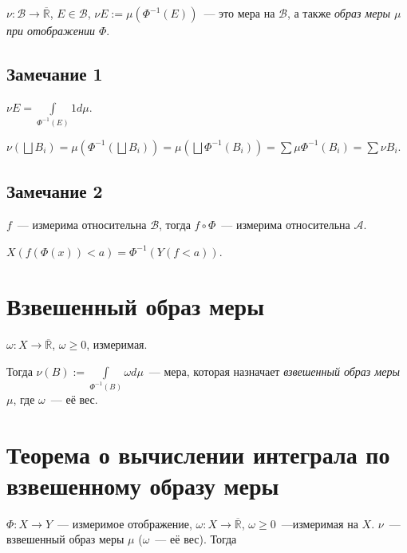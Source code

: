 \documentclass{article}
\begin{document}
        $\nu : \mathcal{B} \rightarrow \overline{\mathbb{R}}$, $E \in \mathcal{B}$, $\nu E := \mu(\Phi^{-1}(E))$~--- это мера на $\mathcal{B}$, а также \textit{образ меры $\mu$ при отображении $\Phi$}.

        \subsection{Замечание 1}
        
            $\nu E = \int\limits_{\Phi^{-1}(E)} 1 d \mu$.
            
            $\nu \left( \bigsqcup B_i \right) = \mu \left( \Phi^{-1} \left( \bigsqcup B_i \right) \right) = \mu \left( \bigsqcup \Phi^{-1}(B_i) \right) = \sum \mu \Phi^{-1}(B_i) = \sum \nu B_i$.
    
        \subsection{Замечание 2}
        
            $f$~--- измерима относительна $\mathcal{B}$, тогда $f \circ \Phi$~--- измерима относительна $\mathcal{A}$. 
            
            $X \left( f \left( \Phi(x) \right) < a \right) = \Phi^{-1} \left( Y (f < a) \right)$.
    
    \newpage
    
    \section{Взвешенный образ меры}
        
        $\omega : X \rightarrow \overline{\mathbb{R}}$, $\omega \geqslant 0$, измеримая. 
        
        Тогда $\nu(B) := \int\limits_{\Phi^{-1}(B)} \omega d \mu$~--- мера, которая назначает \textit{взвешенный образ меры $\mu$}, где $\omega$~--- её вес.
        
    \newpage
    
    \section{Теорема о вычислении интеграла по взвешенному образу меры}
    
        $\Phi : X \rightarrow Y$~--- измеримое отображение, $\omega : X \rightarrow \overline{\mathbb{R}}$, $\omega \geqslant 0$~---измеримая на $X$. $\nu$~--- взвешенный образ меры $\mu$ ($\omega$~--- её вес). Тогда
        
\end{document}
